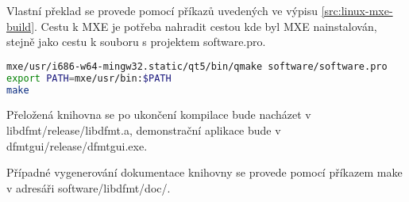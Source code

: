 Vlastní překlad se provede pomocí příkazů uvedených ve výpisu \ref{src:linux-mxe-build}. Cestu k MXE je potřeba nahradit cestou kde byl MXE nainstalován, stejně jako cestu k souboru s projektem software.pro.

\begin{lstlisting}[language=bash, label=src:linux-mxe-build, caption=Překlad pod OS Linux pro OS Windows.]
mxe/usr/i686-w64-mingw32.static/qt5/bin/qmake software/software.pro
export PATH=mxe/usr/bin:$PATH
make
\end{lstlisting}

Přeložená knihovna se po ukončení kompilace bude nacházet v libdfmt/release/libdfmt.a, demonstrační aplikace bude v dfmtgui/release/dfmtgui.exe.


Případné vygenerování dokumentace knihovny se provede pomocí příkazem make v adresáři software/libdfmt/doc/.